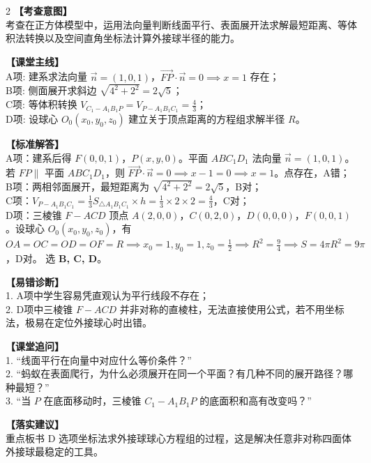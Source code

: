 \documentclass[11pt,a4paper]{ctexart}
\begin{document}
\begin{paracol}{2}
  \textbf{【考查意图】}\\
  考查在正方体模型中，运用法向量判断线面平行、表面展开法求解最短距离、等体积法转换以及空间直角坐标法计算外接球半径的能力。
  
  \textbf{【课堂主线】}\\
  A项: 建系求法向量 $\vec{n} = (1,0,1)$，$\overrightarrow{FP}\cdot\vec{n}=0 \implies x=1$ 存在；\\
  B项: 侧面展开求斜边 $\sqrt{4^2+2^2} = 2\sqrt{5}$；\\
  C项: 等体积转换 $V_{C_1-A_1B_1P} = V_{P-A_1B_1C_1} = \frac{4}{3}$；\\
  D项: 设球心 $O_0(x_0,y_0,z_0)$ 建立关于顶点距离的方程组求解半径 $R$。
  
  \textbf{【标准解答】}\\
  A项：建系后得 $F(0,0,1)$，$P(x,y,0)$。平面 $ABC_1D_1$ 法向量 $\vec{n} = (1,0,1)$。若 $FP \parallel$ 平面 $ABC_1D_1$，则 $\overrightarrow{FP}\cdot\vec{n} = 0 \implies x-1=0 \implies x=1$。点存在，A错；\\
  B项：两相邻面展开，最短距离为 $\sqrt{4^2+2^2} = 2\sqrt{5}$，B对；\\
  C项：$V_{P-A_1B_1C_1} = \frac{1}{3} S_{\triangle A_1B_1C_1} \times h = \frac{1}{3}\times 2\times 2 = \frac{4}{3}$，C对；\\
  D项：三棱锥 $F-ACD$ 顶点 $A(2,0,0)$，$C(0,2,0)$，$D(0,0,0)$，$F(0,0,1)$。设球心 $O_0(x_0,y_0,z_0)$，有 $OA=OC=OD=OF=R \implies x_0=1, y_0=1, z_0=\frac{1}{2} \implies R^2 = \frac{9}{4} \implies S = 4\pi R^2 = 9\pi$，D对。
  选 \textbf{B, C, D}。

  \switchcolumn
  \textbf{【易错诊断】}\\
  1. A项中学生容易凭直观认为平行线段不存在；\\
  2. D项中三棱锥 $F-ACD$ 并非对称的直棱柱，无法直接使用公式，若不用坐标法，极易在定位外接球心时出错。
  
  \textbf{【课堂追问】}\\
  1. “线面平行在向量中对应什么等价条件？”\\
  2. “蚂蚁在表面爬行，为什么必须展开在同一个平面？有几种不同的展开路径？哪种最短？”\\
  3. “当 $P$ 在底面移动时，三棱锥 $C_1-A_1B_1P$ 的底面积和高有改变吗？”
  
  \textbf{【落实建议】}\\
  重点板书 D 选项坐标法求外接球球心方程组的过程，这是解决任意非对称四面体外接球最稳定的工具。
\end{paracol}
\end{document}
